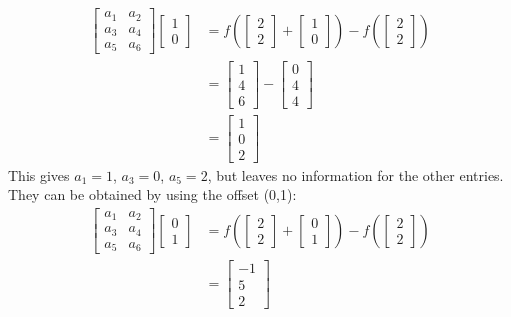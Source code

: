 \documentclass{article}
\theoremstyle{definition}
\begin{document}
\begin{align*}
	\begin{bmatrix}a_1&a_2\\a_3&a_4\\a_5&a_6\end{bmatrix}\begin{bmatrix}1\\0\end{bmatrix}
	&=f\left(\begin{bmatrix}2\\2\end{bmatrix}+\begin{bmatrix}1\\0\end{bmatrix}\right)-f\left(\begin{bmatrix}2\\2\end{bmatrix}\right)\\
	&=\begin{bmatrix}1\\4\\6\end{bmatrix}-\begin{bmatrix}0\\4\\4\end{bmatrix}\\
	&=\begin{bmatrix}1\\0\\2\end{bmatrix}
\end{align*}
This gives $a_1=1$, $a_3=0$, $a_5=2$, but leaves no information for the other entries. They can be obtained by using the offset (0,1):
\begin{align*}
	\begin{bmatrix}a_1&a_2\\a_3&a_4\\a_5&a_6\end{bmatrix}\begin{bmatrix}0\\1\end{bmatrix}
	&=f\left(\begin{bmatrix}2\\2\end{bmatrix}+\begin{bmatrix}0\\1\end{bmatrix}\right)-f\left(\begin{bmatrix}2\\2\end{bmatrix}\right)\\
	&=\begin{bmatrix}-1\\5\\2\end{bmatrix}
\end{align*}
\end{document}
